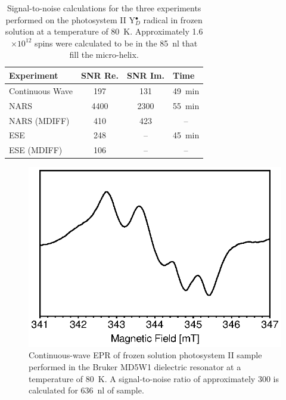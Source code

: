 \begin{table}[htbp]
\centering
\caption[Signal-to-noise calculations.]{Signal-to-noise calculations for the three experiments performed on the photosystem II Y$_D^\bullet$ radical in frozen solution at a temperature of 80~K. Approximately 1.6$\times10^{12}$ spins were calculated to be in the 85~nl that fill the micro-helix.}
\begin{tabular}{llll}
\multicolumn{1}{l|}{Experiment} & \multicolumn{1}{l|}{SNR Re.} & \multicolumn{1}{l|}{SNR Im.} & Time\\ \hline\hline
\multicolumn{1}{l|}{Continuous Wave} & \multicolumn{1}{c|}{197} & \multicolumn{1}{c|}{131} & \multicolumn{1}{c}{49~min} \\\hline
\multicolumn{1}{l|}{NARS} & \multicolumn{1}{c|}{4400} & \multicolumn{1}{c|}{2300} & \multicolumn{1}{c}{55~min} \\\hline
\multicolumn{1}{l|}{NARS (MDIFF)} & \multicolumn{1}{c|}{410} & \multicolumn{1}{c|}{423} & \multicolumn{1}{c}{--} \\\hline
\multicolumn{1}{l|}{ESE} & \multicolumn{1}{c|}{248} & \multicolumn{1}{c|}{--} & \multicolumn{1}{c}{45~min} \\\hline
\multicolumn{1}{l|}{ESE (MDIFF)} & \multicolumn{1}{c|}{106} & \multicolumn{1}{c|}{--} & \multicolumn{1}{c}{--}\\
\end{tabular}\label{table:snrcalc}
\end{table}

\begin{figure}[htbp]
\centering
\includegraphics{Kapitel/Appendix/Images/S5-BBYMD5.eps}
\caption[CW EPR of frozen solution photosystem II in the Bruker MD5W1.]{Continuous-wave EPR of frozen solution photosystem II sample performed in the Bruker MD5W1 dielectric resonator at a temperature of 80~K. A signal-to-noise ratio of approximately 300 is calculated for 636~nl of sample.}
\label{fig:BBYMD5}
\end{figure}

